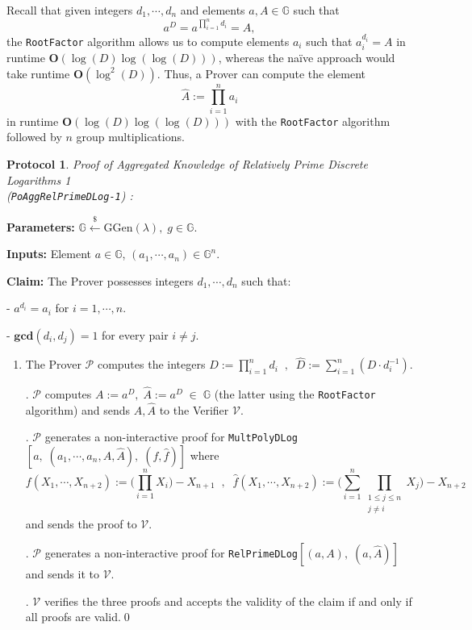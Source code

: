 \documentclass[11pt, lettersize, notitlepage, leqno, footskip=0.6cm]{article}
\newcommand{\pl}{\prod\limits}
\newcommand{\slim}{\sum\limits}
\newcommand{\bG}{\mathbb{G}}
\newcommand{\mc}{\mathcal}
\newcommand{\mb}{\mathbb}
\newcommand{\mbf}{\mathbf}
\newcommand{\mr}{\mathrm}
\newcommand{\lamb}{\lambda}
\newcommand{\what}{\widehat}
\newcommand{\mP}{\mc{P}}
\newcommand{\V}{\mc{V}}
\newcommand{\vs}{\vspace{-0.15cm}}
\newcommand{\noin}{\noindent}
\newcommand{\GCD}{\mbf{gcd}}
\newtheorem{Prot}[Thm]{Protocol}
\numberwithin{equation}{section}
\begin{document}
\noin Recall that given integers $d_1,\cdots,d_n$ and elements $a,A\in\mb{G}$ such that \vs $$a^D = a^{\pl_{i=1}^n d_i} = A ,$$ the {\tt{RootFactor}} algorithm allows us to compute elements $a_i$ such that $a_i^{d_i} = A$ in runtime $\mbf{O}(\log(D)\log(\log(D)))$, whereas the na\"ive approach would take runtime $\mbf{O}(\log^2(D))$. Thus, a Prover can compute the element \vs $$\what{A}:= \pl_{i=1}^n a_i$$ in runtime $\mbf{O}(\log(D)\log(\log(D)))$ with the {\tt{RootFactor}} algorithm followed by $n$ group multiplications.

\vspace{0.2cm}

\begin{Prot} \normalfont \hypertarget{RP1}{\textit{Proof of Aggregated Knowledge of Relatively Prime Discrete Logarithms} 1} \\(\verb|PoAggRelPrimeDLog-1|) :\end{Prot} \vspace{-0.3cm}

\noindent \textbf{Parameters:} $\mb{G}\xleftarrow{\$} \mr{GGen}(\lamb), \; g\in \mb{G}$.

\noindent \textbf{Inputs:} Element $a\in\mb{G}$, $(a_1,\cdots,a_n)\in \mb{G}^n$.

\noindent \textbf{Claim:} The Prover possesses integers $d_1,\cdots, d_n$ such that:

\noindent - $a^{d_i} = a_i$ for $i = 1,\cdots, n$.

\noindent - $\GCD(d_i, d_j) = 1$ for every pair $i\neq j$.


\begin{enumerate}[wide, labelwidth=!, labelindent=0pt]\vs \item The Prover $\mP$ computes the integers $D:=\pl_{i=1}^n d_i\;\;,\;\; \what{D}:= \slim_{i=1}^n (D\cdot d_i^{-1}).$

\noin 2. $\mP$ computes $A:= a^D,\;\what{A}:= a^{\what{D}}\;\in\;\bG $ (the latter using the {\tt{RootFactor}} algorithm) and sends $A,\what{A}$ to the Verifier $\V$.

\begin{comment}
\noin 3. $\mP$ generates a non-interactive proof for \verb|AggKE-1|$[a,\;(a_1,\cdots,a_n)]$ and sends it to $\V$.

\noin 4. \end{comment}


\noin 3. $\mP$ generates a non-interactive proof for \verb|MultPolyDLog|$[a,\;(a_1,\cdots,a_n,A, \what{A}),\; (f,\what{f})]$ where \vs $$f(X_1,\cdots,X_{n+2}):= \big(\pl_{i=1}^n X_i\big) -X_{n+1}\;\;,\;\;\what{f}(X_1,\cdots, X_{n+2}):= \big(\slim_{i=1}^n \pl_{\substack{1\leq j\leq n \\ j\neq i}} X_j\big) - X_{n+2}$$ and sends the proof to $\V$.

\noin 4. $\mP$ generates a non-interactive proof for \verb|RelPrimeDLog|$[(a,A),\;(a,\what{A})]$ and sends it to $\V$.

\noin 5. $\V$ verifies the three proofs and accepts the validity of the claim if and only if all proofs are valid.\qed \end{enumerate}
\end{document}
